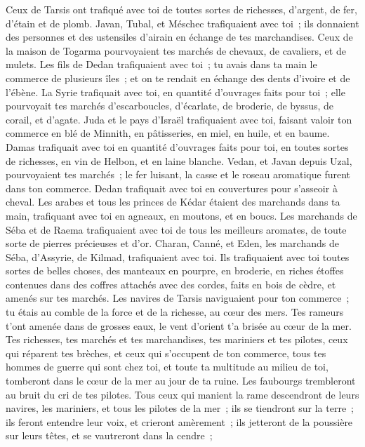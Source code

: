 \begin{multicols}{2}
Ceux de Tarsis ont trafiqué avec toi de toutes sortes de richesses, d'argent, de fer, d'étain et de plomb.
Javan, Tubal, et Méschec trafiquaient avec toi~; ils donnaient des personnes et des ustensiles d'airain en échange de tes marchandises.
Ceux de la maison de Togarma pourvoyaient tes marchés de chevaux, de cavaliers, et de mulets.
Les fils de Dedan trafiquaient avec toi~; tu avais dans ta main le commerce de plusieurs îles~; et on te rendait en échange des dents d'ivoire et de l'ébène.
La Syrie trafiquait avec toi, en quantité d'ouvrages faits pour toi~; elle pourvoyait tes marchés d'escarboucles, d'écarlate, de broderie, de byssus, de corail, et d'agate.
Juda et le pays d'Israël trafiquaient avec toi, faisant valoir ton commerce en blé de Minnith, en pâtisseries, en miel, en huile, et en baume.
Damas trafiquait avec toi en quantité d'ouvrages faits pour toi, en toutes sortes de richesses, en vin de Helbon, et en laine blanche.
Vedan, et Javan depuis Uzal, pourvoyaient tes marchés~; le fer luisant, la casse et le roseau aromatique furent dans ton commerce.
Dedan trafiquait avec toi en couvertures pour s'asseoir à cheval.
Les arabes et tous les princes de Kédar étaient des marchands dans ta main, trafiquant avec toi en agneaux, en moutons, et en boucs.
Les marchands de Séba et de Raema trafiquaient avec toi de tous les meilleurs aromates, de toute sorte de pierres précieuses et d'or.
Charan, Canné, et Eden, les marchands de Séba, d'Assyrie, de Kilmad, trafiquaient avec toi.
Ils trafiquaient avec toi toutes sortes de belles choses, des manteaux en pourpre, en broderie, en riches étoffes contenues dans des coffres attachés avec des cordes, faits en bois de cèdre, et amenés sur tes marchés.
Les navires de Tarsis naviguaient pour ton commerce~; tu étais au comble de la force et de la richesse, au cœur des mers.
Tes rameurs t'ont amenée dans de grosses eaux, le vent d'orient t'a brisée au cœur de la mer.
Tes richesses, tes marchés et tes marchandises, tes mariniers et tes pilotes, ceux qui réparent tes brèches, et ceux qui s'occupent de ton commerce, tous tes hommes de guerre qui sont chez toi, et toute ta multitude au milieu de toi, tomberont dans le cœur de la mer au jour de ta ruine.
Les faubourgs trembleront au bruit du cri de tes pilotes.
Tous ceux qui manient la rame descendront de leurs navires, les mariniers, et tous les pilotes de la mer~; ils se tiendront sur la terre~;
ils feront entendre leur voix, et crieront amèrement~; ils jetteront de la poussière sur leurs têtes, et se vautreront dans la cendre~;

\end{multicols}
